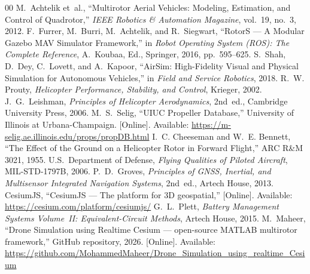 \documentclass[a4paper, conference]{IEEEtran}
\begin{document}
\FloatBarrier

\begin{thebibliography}{00}
 M.~Achtelik et~al., ``Multirotor Aerial Vehicles:
Modeling, Estimation, and Control of Quadrotor,'' \emph{IEEE Robotics
\& Automation Magazine}, vol.~19, no.~3, 2012.
 F.~Furrer, M.~Burri, M.~Achtelik, and R.~Siegwart,
``RotorS --- A Modular Gazebo MAV Simulator Framework,'' in
\emph{Robot Operating System (ROS): The Complete Reference},
A.~Koubaa, Ed., Springer, 2016, pp.~595--625.
 S.~Shah, D.~Dey, C.~Lovett, and A.~Kapoor,
``AirSim: High-Fidelity Visual and Physical Simulation for
Autonomous Vehicles,'' in \emph{Field and Service Robotics}, 2018.
 R.~W. Prouty, \emph{Helicopter Performance,
Stability, and Control}, Krieger, 2002.
 J.~G.~Leishman, \emph{Principles of Helicopter
Aerodynamics}, 2nd~ed., Cambridge University Press, 2006.
 M.~S.~Selig, ``UIUC Propeller Database,'' University
of Illinois at Urbana-Champaign. [Online]. Available:
\url{https://m-selig.ae.illinois.edu/props/propDB.html}
 I.~C. Cheeseman and W.~E. Bennett,
``The Effect of the Ground on a Helicopter Rotor in Forward Flight,''
ARC R\&M 3021, 1955.
 U.S.~Department of Defense,
\emph{Flying Qualities of Piloted Aircraft}, MIL-STD-1797B, 2006.
 P.~D.~Groves, \emph{Principles of GNSS, Inertial,
and Multisensor Integrated Navigation Systems}, 2nd~ed., Artech
House, 2013.
 CesiumJS, ``CesiumJS --- The platform for 3D
geospatial,'' [Online]. Available:
\url{https://cesium.com/platform/cesiumjs/}
 G.~L.~Plett, \emph{Battery Management Systems
Volume~II: Equivalent-Circuit Methods}, Artech House, 2015.
 M.~Maheer, ``Drone Simulation using Realtime Cesium
--- open-source MATLAB multirotor framework,'' GitHub repository,
2026. [Online]. Available:
\url{https://github.com/MohammedMaheer/Drone_Simulation_using_realtime_Cesium}
\end{thebibliography}
\end{document}
